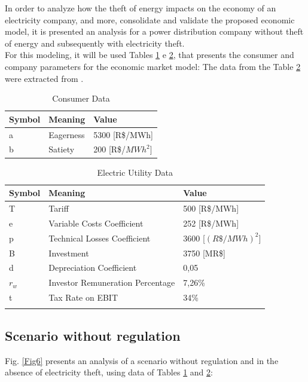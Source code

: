 \documentclass[10pt, letterpaper]{elsarticle}
\begin{document}
In order to analyze how the theft of energy impacts on the economy of an electricity company, and more, consolidate and validate the proposed economic model, it is presented an analysis for a power distribution company without theft of energy and subsequently with electricity theft. \\
For this modeling, it will be used Tables \ref{tA} e \ref{tB}, that presents the consumer and company parameters for the economic market model:
The data from the Table \ref{tB} were extracted from \citet{ANEEL2008Second33/208.}.

\begin{table} [h]%
\centering
\caption{Consumer Data}
\begin{tabular} {lll}
\hline 
\textbf{Symbol}&\textbf{Meaning}&\textbf{Value}\\
\hline
a&Eagerness&5300 [R\$/MWh]\\

b&Satiety&200 [R\$/$MWh^2$]\\
\hline 
\end{tabular}
\label{tA}
\end{table}

\begin{table}[h]%
\centering
\caption{Electric Utility Data}
\begin{tabular}{lll}
\hline
\textbf{Symbol}& \textbf{Meaning}& \textbf{Value}\\
\hline
T&Tariff&500 [R\$/MWh]\\
e&Variable Costs Coefficient&252 [R\$/MWh]\\
p&Technical Losses Coefficient&3600 [$(R\$/MWh)^2$]\\
B&Investment&3750 [MR\$]\\
d&Depreciation Coefficient&0,05\\
$r_w$&Investor Remuneration Percentage&7,26\%\\
t&Tax Rate on EBIT&34\%\\
\hline
\label{tB}
\end{tabular}
\end{table}

\subsection{Scenario without regulation}
\label{sec3-1}

Fig. \ref{Fig6} presents an analysis  of a scenario without regulation and in the absence of electricity theft, using data of Tables \ref{tA} and \ref{tB}:\\
\end{document}
